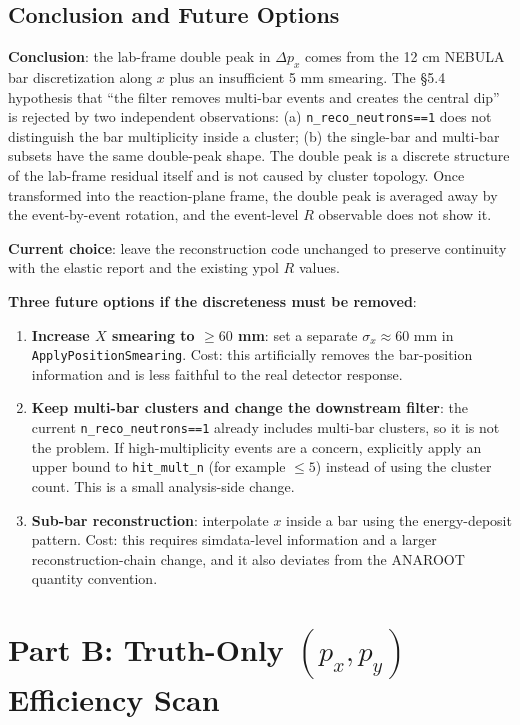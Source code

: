 \documentclass[a4paper,11pt]{article}
\begin{document}
\subsection{Conclusion and Future Options}

\textbf{Conclusion}: the lab-frame double peak in $\Delta p_x$ comes from the
12 cm NEBULA bar discretization along $x$ plus an insufficient 5 mm smearing.
The \S5.4 hypothesis that ``the filter removes multi-bar events and creates the
central dip'' is rejected by two independent observations: (a)
\texttt{n\_reco\_neutrons==1} does not distinguish the bar multiplicity inside a
cluster; (b) the single-bar and multi-bar subsets have the same double-peak
shape. The double peak is a discrete structure of the lab-frame residual itself
and is not caused by cluster topology. Once transformed into the reaction-plane
frame, the double peak is averaged away by the event-by-event rotation, and the
event-level $R$ observable does not show it.

\textbf{Current choice}: leave the reconstruction code unchanged to preserve
continuity with the elastic report and the existing ypol $R$ values.

\textbf{Three future options if the discreteness must be removed}:
\begin{enumerate}
    \item \textbf{Increase $X$ smearing to $\geq 60$ mm}: set a separate
          $\sigma_x \approx 60$ mm in \texttt{ApplyPositionSmearing}. Cost:
          this artificially removes the bar-position information and is less
          faithful to the real detector response.
    \item \textbf{Keep multi-bar clusters and change the downstream filter}:
          the current \texttt{n\_reco\_neutrons==1} already includes multi-bar
          clusters, so it is not the problem. If high-multiplicity events are a
          concern, explicitly apply an upper bound to \texttt{hit\_mult\_n}
          (for example $\leq 5$) instead of using the cluster count. This is a
          small analysis-side change.
    \item \textbf{Sub-bar reconstruction}: interpolate $x$ inside a bar using
          the energy-deposit pattern. Cost: this requires simdata-level
          information and a larger reconstruction-chain change, and it also
          deviates from the ANAROOT quantity convention.
\end{enumerate}

\section{Part B: Truth-Only $(p_x,p_y)$ Efficiency Scan}
\end{document}

